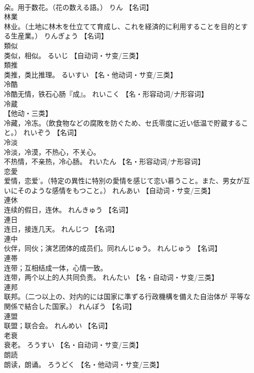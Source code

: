 \documentclass[8pt]{extreport}
\begin{document}
\begin{CJK}{UTF8}{min}
\\	朵。用于数花。（花の数える語。）	りん		【名词】
\\	林業	
\\	林业。（土地に林木を仕立てて育成し、これを経済的に利用することを目的とする生産業。）	りんぎょう		【名词】
\\	類似	
\\	类似，相似。	るいじ		【自动词・サ变/三类】
\\	類推	
\\	类推，类比推理。	るいすい		【名・他动词・サ变/三类】
\\	冷酷	
\\	冷酷无情，铁石心肠『成』。	れいこく		【名・形容动词/ナ形容词】
\\	冷蔵	
\\	【他动・三类】 
\\	冷藏，冷冻。（飲食物などの腐敗を防ぐため、セ氏零度に近い低温で貯蔵すること。）	れいぞう		【名词】
\\	冷淡	
\\	冷淡，冷漠，不热心，不关心。 
\\	不热情，不亲热，冷心肠。	れいたん		【名・形容动词/ナ形容词】
\\	恋愛	
\\	爱情，恋爱'。（特定の異性に特別の愛情を感じて恋い慕うこと。また、男女が互いにそのような感情をもつこと。）	れんあい		【自动词・サ变/三类】
\\	連休	
\\	连续的假日，连休。	れんきゅう		【名词】
\\	連日	
\\	连日，接连几天。	れんじつ		【名词】
\\	連中	
\\	伙伴，同伙；演艺团体的成员们。同れんじゅう。	れんじゅう		【名词】
\\	連帯	
\\	连带；互相结成一体，心情一致。 
\\	连带，两个以上的人共同负责。	れんたい		【名・自动词・サ变/三类】
\\	連邦	
\\	联邦。（二つ以上の、対内的には国家に準ずる行政機構を備えた自治体が 平等な関係で結合した国家。）	れんぽう		【名词】
\\	連盟	
\\	联盟；联合会。	れんめい		【名词】
\\	老衰	
\\	衰老。	ろうすい		【名・自动词・サ变/三类】
\\	朗読	
\\	朗读，朗诵。	ろうどく		【名・他动词・サ变/三类】

\end{CJK}
\end{document}
